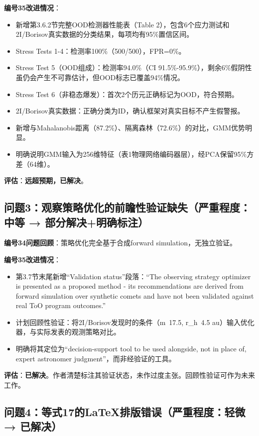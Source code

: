 \documentclass[12pt]{article}
\begin{document}
\textbf{编号35改进情况}：
\begin{itemize}
    \item 新增第3.6.2节完整OOD检测器性能表（Table 2），包含6个应力测试和2I/Borisov真实数据的分类结果，每项均有95\%置信区间。
    \item Stress Tests 1-4：检测率100\%（500/500），FPR=0\%。
    \item Stress Test 5（OOD组成）：检测率94.0\%（CI 91.5\%-95.9\%），剩余6\%假阴性虽仍会产生不可靠估计，但OOD标志已覆盖94\%情况。
    \item Stress Test 6（非稳态爆发）：首次2个历元正确标记为OOD，符合预期。
    \item 2I/Borisov真实数据：正确分类为ID，确认框架对真实目标不产生假警报。
    \item 新增与Mahalanobis距离（87.2\%）、隔离森林（72.6\%）的对比，GMM优势明显。
    \item 明确说明GMM输入为256维特征（表1物理网络编码器层），经PCA保留95\%方差（64维）。
\end{itemize}
\textbf{评估}：\textbf{远超预期，已解决}。

\subsection{问题3：观察策略优化的前瞻性验证缺失（严重程度：中等 → 部分解决+明确标注）}

\textbf{编号34问题回顾}：策略优化完全基于合成forward simulation，无独立验证。

\textbf{编号35改进情况}：
\begin{itemize}
    \item 第3.7节末尾新增“Validation status”段落：“The observing strategy optimizer is presented as a proposed method - its recommendations are derived from forward simulation over synthetic comets and have not been validated against real ToO program outcomes.”
    \item 计划回顾性验证：将2I/Borisov发现时的条件（m~17.5, r_h~4.5 au）输入优化器，与实际发表的观测策略对比。
    \item 明确将其定位为“decision-support tool to be used alongside, not in place of, expert astronomer judgment”，而非经验证的工具。
\end{itemize}
\textbf{评估}：\textbf{已解决}。作者清楚标注其验证状态，未作过度主张。回顾性验证可作为未来工作。

\subsection{问题4：等式17的LaTeX排版错误（严重程度：轻微 → 已解决）}
\end{document}
